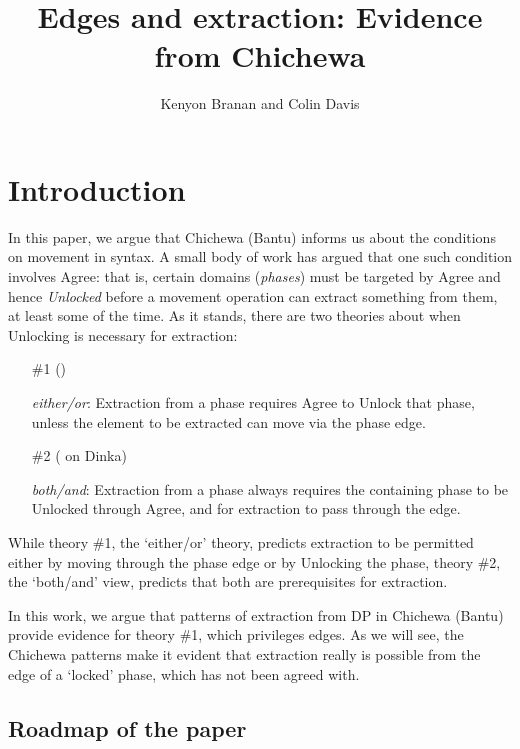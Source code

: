 \documentclass[output=paper,colorlinks,citecolor=brown]{langscibook}
\title{Edges and extraction: Evidence from Chichewa}
\author{Kenyon Branan\affiliation{MIT} and Colin Davis\affiliation{MIT}}
\begin{document}
\maketitle 

\section{Introduction}\label{sec:branan:1}

In this paper, we argue that Chichewa (Bantu) informs us about the conditions on movement in syntax. A small body of work has argued that one such condition involves Agree: that is, certain domains (\textit{phases}) must be targeted by Agree and hence \textit{Unlocked} before a movement operation can extract something from them, at least some of the time. As it stands, there are two theories about when Unlocking is necessary for extraction:

\begin{itemize}
	\item[\#1] (\citealt{RackowskiRichards2005, Halpert2016, Halpert2019, Branan2018})

    \textit{either/or}: Extraction from a phase requires Agree to Unlock that phase, unless the element to be extracted can move via the phase edge.

    \item[\#2] (\citealt{VanUrkRichards2015} on Dinka)

    \textit{both/and}: Extraction from a phase always requires the containing phase to be Unlocked through Agree, and for extraction to pass through the edge.
\end{itemize}

While theory \#1, the `either/or' theory, predicts extraction to be permitted either by moving through the phase edge or by Unlocking the phase, theory \#2, the `both/and' view, predicts that both are prerequisites for extraction.

In this work, we argue that patterns of extraction from DP in Chichewa (Bantu) provide evidence for theory \#1, which privileges edges. As we will see, the Chichewa patterns make it evident that extraction really is possible from the edge of a `locked' phase, which has not been agreed with.

\subsection{Roadmap of the paper}\label{sec:branan:1.1}
\end{document}
